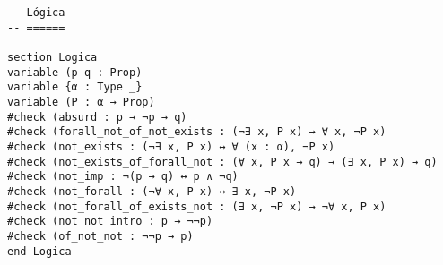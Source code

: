 \begin{verbatim}
-- Lógica
-- ======

section Logica
variable (p q : Prop)
variable {α : Type _}
variable (P : α → Prop)
#check (absurd : p → ¬p → q)
#check (forall_not_of_not_exists : (¬∃ x, P x) → ∀ x, ¬P x)
#check (not_exists : (¬∃ x, P x) ↔ ∀ (x : α), ¬P x)
#check (not_exists_of_forall_not : (∀ x, P x → q) → (∃ x, P x) → q)
#check (not_imp : ¬(p → q) ↔ p ∧ ¬q)
#check (not_forall : (¬∀ x, P x) ↔ ∃ x, ¬P x)
#check (not_forall_of_exists_not : (∃ x, ¬P x) → ¬∀ x, P x)
#check (not_not_intro : p → ¬¬p)
#check (of_not_not : ¬¬p → p)
end Logica
\end{verbatim}


